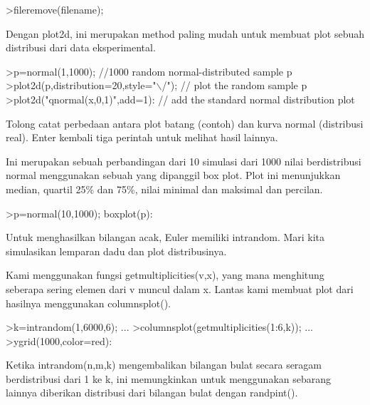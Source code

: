 \documentclass[a4paper,10pt]{article}
\begin{document}
\begin{eulernotebook}
\begin{eulerprompt}
>fileremove(filename);
\end{eulerprompt}
\begin{eulercomment}
Dengan plot2d, ini merupakan method paling mudah untuk membuat plot sebuah distribusi dari
data eksperimental.
\end{eulercomment}
\begin{eulerprompt}
>p=normal(1,1000); //1000 random normal-distributed sample p
>plot2d(p,distribution=20,style="\(\backslash\)/"); // plot the random sample p
>plot2d("qnormal(x,0,1)",add=1): // add the standard normal distribution plot
\end{eulerprompt}
\begin{eulercomment}
Tolong catat perbedaan antara plot batang (contoh) dan kurva normal (distribusi real).
Enter kembali tiga perintah untuk melihat hasil lainnya.
\end{eulercomment}
\begin{eulercomment}
Ini merupakan sebuah perbandingan dari 10 simulasi dari 1000 nilai berdistribusi normal
menggunakan sebuah yang dipanggil box plot. Plot ini menunjukkan median, quartil 25\% dan
75\%, nilai minimal dan maksimal dan percilan.
\end{eulercomment}
\begin{eulerprompt}
>p=normal(10,1000); boxplot(p):
\end{eulerprompt}
\begin{eulercomment}
Untuk menghasilkan bilangan acak, Euler memiliki intrandom. Mari kita simulasikan lemparan
dadu dan plot distribusinya.

Kami menggunakan fungsi getmultiplicities(v,x), yang mana menghitung seberapa sering
elemen dari v muncul dalam x. Lantas kami membuat plot dari hasilnya menggunakan
columnsplot().
\end{eulercomment}
\begin{eulerprompt}
>k=intrandom(1,6000,6);  ...
>columnsplot(getmultiplicities(1:6,k));  ...
>ygrid(1000,color=red):
\end{eulerprompt}
\begin{eulercomment}
Ketika intrandom(n,m,k) mengembalikan bilangan bulat secara seragam berdistribusi dari 1
ke k, ini memungkinkan untuk menggunakan sebarang lainnya diberikan distribusi dari
bilangan bulat dengan randpint().


\end{eulercomment}
\end{eulernotebook}
\end{document}
